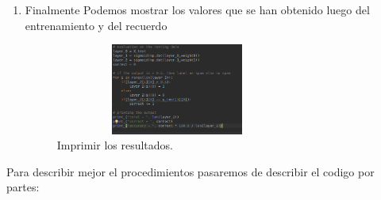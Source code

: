 \documentclass[12pt]{article}
\newcounter{subsubsubsection}[subsubsection]
\begin{document}
\begin{enumerate}
\clearpage
\item
Finalmente Podemos mostrar los valores que se han obtenido luego del entrenamiento y del recuerdo
 \begin{figure}[h]
\includegraphics[width=8cm, height=3cm]{mlp_result}	
\centering
\caption{Imprimir los resultados.}
\label{fig:RPROP_READ}
\end{figure}

\end{enumerate}


Para describir mejor el procedimientos pasaremos de describir el codigo por partes:
\end{document}
